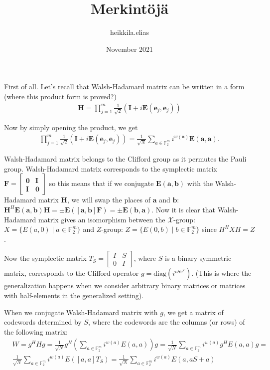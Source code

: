 \documentclass{article}
\title{Merkintöjä}
\author{heikkila.elias }
\date{November 2021}
\begin{document}
	First of all. Let's recall that Walsh-Hadamard matrix can be written in a form (where this product form is proved?)
	\begin{align*}
		\mathbf{H} = \prod_{j=1}^m \frac{1}{\sqrt{2}} (\mathbf{I} + i\mathbf{E}(\mathbf{e}_j, \mathbf{e}_j))
	\end{align*}
	
	Now by simply opening the product, we get
	\begin{align*}
		\prod_{j=1}^m \frac{1}{\sqrt{2}} (\mathbf{I} + i\mathbf{E}(\mathbf{e}_j, \mathbf{e}_j)) = \frac{1}{\sqrt{N}} \sum_{a \in \mathbb{F}^m_2} i^{w(\mathbf{a})}\mathbf{E}(\mathbf{a},\mathbf{a}).
	\end{align*}
	
	Walsh-Hadamard matrix belongs to the Clifford group as it permutes the Pauli group. Walsh-Hadamard matrix corresponds to the symplectic matrix $\mathbf{F} = \begin{bmatrix}
		\mathbf{0} & \mathbf{I} \\
		\mathbf{I} & \mathbf{0}
	\end{bmatrix}$
	so this means that if we conjugate $\mathbf{E}(\mathbf{a},\mathbf{b})$ with the Walsh-Hadamard matrix $\mathbf{H}$, we will swap the places of $\mathbf{a}$ and $\mathbf{b}$: $\mathbf{H}^H\mathbf{E}(\mathbf{a},\mathbf{b})\mathbf{H} = \pm \mathbf{E}(\left[\mathbf{a},\mathbf{b}\right]\mathbf{F}) = \pm \mathbf{E}(\mathbf{b},\mathbf{a})$. Now it is clear that Walsh-Hadamard matrix gives an isomorphism between the $\mathcal{X}$-group: $X = \{E(a,0) \mid a \in \mathbb{F}^m_2 \}$ and $Z$-group: $Z = \{E(0,b) \mid b \in \mathbb{F}^m_2 \}$ since $H^HXH = Z$.
	
	Now the symplectic matrix $T_S = \begin{bmatrix} I & S \\ 0 & I \end{bmatrix}$, where $S$ is a binary symmetric matrix, corresponds to the Clifford operator $g = \text{diag}(i^{vSv^T})$. (This is where the generalization happens when we consider arbitrary binary matrices or matrices with half-elements in the generalized setting).
	
	When we conjugate Walsh-Hadamard matrix with $g$, we get a matrix of codewords determined by $S$, where the codewords are the columns (or rows) of the following matrix:
	\begin{align*}
		&W = g^HHg = \frac{1}{\sqrt{N}}g^H\left(\sum_{a \in \mathbb{F}^m_2} i^{w(a)}E(a,a)\right)g = \frac{1}{\sqrt{N}}\sum_{a \in \mathbb{F}^m_2} i^{w(a)}g^HE(a,a)g = \\ &\frac{1}{\sqrt{N}}\sum_{a \in \mathbb{F}^m_2} i^{w(a)}E(\left[a,a\right]T_S) = \frac{1}{\sqrt{N}}\sum_{a \in \mathbb{F}^m_2} i^{w(a)}E(a,aS + a)
	\end{align*}
	
\end{document}
